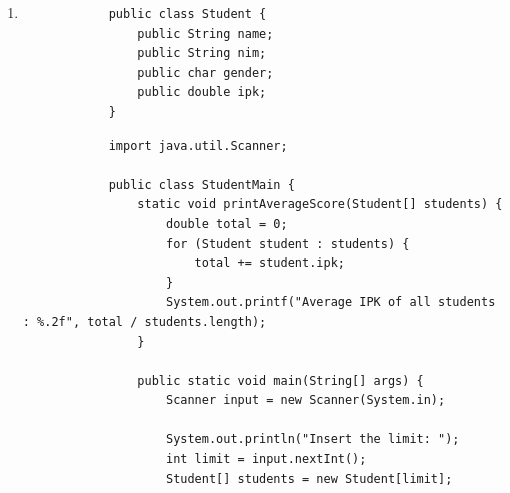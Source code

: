 \documentclass[12pt,titlepage]{article}
\begin{document}
\begin{enumerate}
{\begin{verbatim}
                public static void main(String[] args) {
                    Scanner input = new Scanner(System.in);

                    System.out.print("How many lands? ");
                    int limit = input.nextInt();

                    Land[] lands = new Land[limit];
                    for (int i = 0; i < lands.length; i++) {
                        lands[i] = new Land();
                        System.out.printf("Land %d\n", i + 1);
                        System.out.print("Length: ");
                        lands[i].length = input.nextInt();
                        System.out.print("Width: ");
                        lands[i].width = input.nextInt();
                    }

                    for (int i = 0; i < lands.length; i++) {
                        System.out.printf("Land Area %d: %.2f\n", i + 1, lands[i].calculateArea());
                    }

                    System.out.println();
                    printWidestArea(lands);
                }
            }

        \end{verbatim}
    }
    \item {
        \begin{verbatim}
            public class Student {
                public String name;
                public String nim;
                public char gender;
                public double ipk;
            }
        \end{verbatim}

        \begin{verbatim}
            import java.util.Scanner;

            public class StudentMain {
                static void printAverageScore(Student[] students) {
                    double total = 0;
                    for (Student student : students) {
                        total += student.ipk;
                    }
                    System.out.printf("Average IPK of all students : %.2f", total / students.length);
                }

                public static void main(String[] args) {
                    Scanner input = new Scanner(System.in);

                    System.out.println("Insert the limit: ");
                    int limit = input.nextInt();
                    Student[] students = new Student[limit];


\end{verbatim}}
\end{enumerate}
\end{document}
